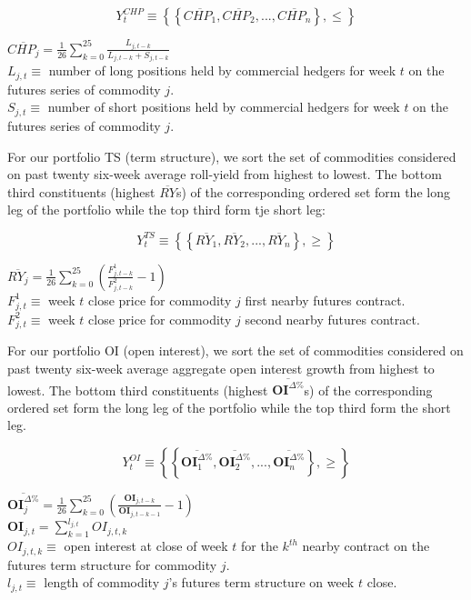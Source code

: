 \documentclass[11pt, letterpaper, doublespacing]{article}
\begin{document}
\[Y_{t}^{CHP}\equiv\left \{ \left \{ \overline{CHP_{1}}, \overline{CHP_{2}}, ..., \overline{CHP_{n}} \right \}, \leq \right \}\]

\(\overline{CHP_{j}}=\frac{1}{26}\sum_{k=0}^{25}\frac{L_{j,t-k}}{L_{j,t-k}+S_{j,t-k}}\)\\
\(L_{j,t}\equiv\) number of long positions held by commercial hedgers
for week \(t\) on the futures series of commodity \(j\).\\
\(S_{j,t}\equiv\) number of short positions held by commercial hedgers
for week \(t\) on the futures series of commodity \(j\).

For our portfolio TS (term structure), we sort the set of commodities
considered on past twenty six-week average roll-yield from highest to
lowest. The bottom third constituents (highest \(\overline{RY}\)s) of
the corresponding ordered set form the long leg of the portfolio while
the top third form tje short leg:

\[Y_{t}^{TS}\equiv\left \{ \left \{ \overline{RY_{1}}, \overline{RY_{2}}, ..., \overline{RY_{n}} \right \}, \geq \right \}\]

\(\overline{RY_{j}}=\frac{1}{26}\sum_{k=0}^{25}(\frac{F_{j,t-k}^{1}}{F_{j,t-k}^{2}} - 1)\)\\
\(F_{j,t}^{1}\equiv\) week \(t\) close price for commodity \(j\) first
nearby futures contract.\\
\(F_{j,t}^{2}\equiv\) week \(t\) close price for commodity \(j\) second
nearby futures contract.

For our portfolio OI (open interest), we sort the set of commodities
considered on past twenty six-week average aggregate open interest
growth from highest to lowest. The bottom third constituents (highest
\(\overline{\mathbf{OI}^{\Delta \%}}\)s) of the corresponding ordered
set form the long leg of the portfolio while the top third form the
short leg.

\[Y_{t}^{OI}\equiv\left \{ \left \{ \overline{\mathbf{OI}_{1}^{\Delta \%}}, \overline{\mathbf{OI}_{2}^{\Delta \%}}, ..., \overline{\mathbf{OI}_{n}^{\Delta \%}} \right \}, \geq \right \}\]

\(\overline{\mathbf{OI}_{j}^{\Delta \%}}=\frac{1}{26}\sum_{k=0}^{25}(\frac{\mathbf{OI}_{j,t-k}}{\mathbf{OI}_{j,t-k-1}} - 1)\)\\
\(\mathbf{OI}_{j,t}=\sum_{k=1}^{l_{j,t}}OI_{j,t,k}\)\\
\(OI_{j,t,k}\equiv\) open interest at close of week \(t\) for the
\(k^{th}\) nearby contract on the futures term structure for commodity
\(j\).\\
\(l_{j,t}\equiv\) length of commodity \(j\)'s futures term structure on
week \(t\) close.
\end{document}
